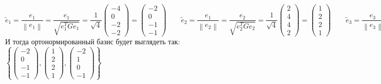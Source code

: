 \documentclass{article}
\begin{document}
\begin{center}
    $$
        \tilde{e}_1 = \frac{e_1}{\left\lVert e_1\right\rVert} = \frac{e_1}{\sqrt{e_1^TGe_1}} =\frac{1}{\sqrt{4}}\begin{pmatrix}
            -4 \\ 0 \\ -2 \\ -2
        \end{pmatrix} = \begin{pmatrix}
            -2 \\ 0 \\ -1 \\ -1
        \end{pmatrix} \qquad
        \tilde{e}_2 = \frac{e_1}{\left\lVert e_2\right\rVert} = \frac{e_2}{\sqrt{e_2^TGe_2}} =\frac{1}{\sqrt{4}}\begin{pmatrix}
            2 \\ 4 \\ 4 \\ 2
        \end{pmatrix} = \begin{pmatrix}
            1 \\ 2 \\ 2 \\ 1
        \end{pmatrix} \qquad
        \tilde{e}_3 = \frac{e_3}{\left\lVert e_3\right\rVert} = \frac{e_3}{\sqrt{e_3^TGe_3}} =\frac{1}{\sqrt{1}}\begin{pmatrix}
            -2 \\ 1 \\ 0 \\ -1
        \end{pmatrix} = \begin{pmatrix}
            -2 \\ 1 \\ 0 \\ -1
        \end{pmatrix}
    $$
    И тогда ортонормированный базис будет выглядеть так: $\left\{\begin{pmatrix}
        -2 \\ 0 \\ -1 \\ -1
    \end{pmatrix}, \begin{pmatrix}
        1 \\ 2 \\ 2 \\ 1
    \end{pmatrix}, \begin{pmatrix}
        -2 \\ 1 \\ 0 \\ -1
    \end{pmatrix}\right\} $
\end{center}
\end{document}
